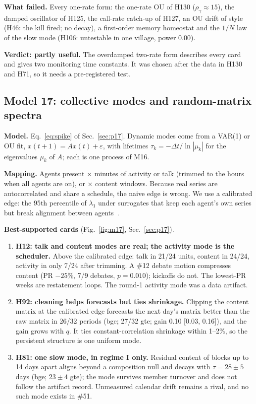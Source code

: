 \textbf{What failed.} Every one-rate form: the one-rate OU of H130 ($\rho_\gamma\approx15$), the damped oscillator of H125, the call-rate catch-up of H127, an OU drift of style (H46: the kill fired; no decay), a first-order memory homeostat  and the $1/N$ law of the slow mode (H106: untestable in one village, power 0.00).

\textbf{Verdict: partly useful.} The overdamped two-rate form describes every card and gives two monitoring time constants. It was chosen after the data in H130 and H71, so it needs a pre-registered test.

\subsection{Model 17: collective modes and random-matrix spectra}\label{sec:m17}

\textbf{Model.} Eq.~\eqref{eq:spike} of Sec.~\ref{sec:p17}. Dynamic modes come from a VAR(1) or OU fit, $x(t+1)=Ax(t)+\varepsilon$, with lifetimes $\tau_k=-\Delta t/\ln|\mu_k|$ for the eigenvalues $\mu_k$ of $A$; each is one process of M16.

\textbf{Mapping.} Agents present $\times$ minutes of activity or talk (trimmed to the hours when all agents are on), or $\times$ content windows. Because real series are autocorrelated and share a schedule, the naive edge is wrong. We use a calibrated edge: the 95th percentile of $\lambda_1$ under surrogates that keep each agent's own series but break alignment between agents~\cite{laloux1999}.

\textbf{Best-supported cards} (Fig.~\ref{fig:m17}, Sec.~\ref{sec:p17}).
\begin{enumerate}
\item \textbf{H12: talk and content modes are real; the activity mode is the scheduler.} Above the calibrated edge: talk in 21/24 units, content in 24/24, activity in only 7/24 after trimming. A \#12 debate motion compresses content (PR $-25\%$, 7/9 debates, $p=0.010$); kickoffs do not. The lowest-PR weeks are restatement loops. The round-1 activity mode was a data artifact.
\item \textbf{H92: cleaning helps forecasts but ties shrinkage.} Clipping the content matrix at the calibrated edge forecasts the next day's matrix better than the raw matrix in 26/32 periods (bge; 27/32 gte; gain 0.10 [0.03, 0.16]), and the gain grows with $q$. It ties constant-correlation shrinkage within 1--2\%, so the persistent structure is one uniform mode.
\item \textbf{H81: one slow mode, in regime I only.} Residual content of blocks up to 14 days apart aligns beyond a composition null and decays with $\tau=28\pm5$ days (bge; $23\pm4$ gte); the mode survives member turnover and does not follow the artifact record. Unmeasured calendar drift remains a rival, and no such mode exists in \#51.
\end{enumerate}

